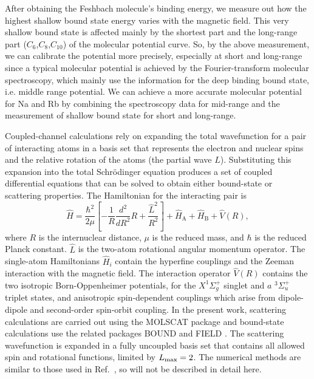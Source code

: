 After obtaining the Feshbach molecule's binding energy, we measure out how the highest shallow bound state energy varies with the magnetic field. This very shallow bound state is affected mainly by the shortest part and the long-range part ($C_6$,$C_8$,$C_{10}$) of the molecular potential curve. So, by the above measurement, we can calibrate the potential more precisely, especially at short and long-range since a typical molecular potential is achieved by the Fourier-transform molecular spectroscopy\cite{Pashov2005}, which mainly use the information for the deep binding bound state, i.e. middle range potential. We can achieve a more accurate molecular potential for Na and Rb by combining the spectroscopy data for mid-range and the measurement of shallow bound state for short and long-range. 

Coupled-channel calculations rely on expanding the total wavefunction for a pair of interacting atoms in a basis set that represents the electron and nuclear spins and the relative rotation of the atoms (the partial wave $L$). Substituting this expansion into the total Schr\"odinger equation produces a set of coupled differential equations that can be solved to obtain either bound-state or scattering properties. The Hamiltonian for the interacting pair is
\begin{equation}
\label{full_H}
\hat{H} =\frac{\hbar^2}{2\mu}\left[-\frac{1}{R}\frac{d^2}{dR^2}R
+\frac{\hat{L}^2}{R^2}\right]+\hat{H}_\textrm{A}+\hat{H}_\textrm{B}+\hat{V}(R),
\end{equation}
where $R$ is the internuclear distance, $\mu$ is the reduced mass, and $\hbar$ is the reduced Planck constant. $\hat{L}$ is the two-atom rotational angular momentum operator. The single-atom Hamiltonians $\hat{H}_i$ contain the hyperfine couplings and the Zeeman interaction with the magnetic field. The interaction operator $\hat{V}(R)$ contains the two isotropic Born-Oppenheimer potentials, for the $X^1\Sigma_g^+$ singlet and $a$ $^3\Sigma_u^+$ triplet states, and anisotropic spin-dependent couplings which arise from dipole-dipole and second-order spin-orbit coupling. In the present work, scattering calculations are carried out using the MOLSCAT package
\cite{molscat:2019,mbf-github:2020} and bound-state calculations use the related packages BOUND and FIELD \cite{mbf-github:2020}. The scattering wavefunction is expanded in a fully uncoupled basis set that contains all allowed spin and rotational functions, limited by $L_{\rm max}=2$. The numerical methods are similar to those used in Ref.\ \cite{Berninger:Cs2:2013}, so will not be described in detail here.

